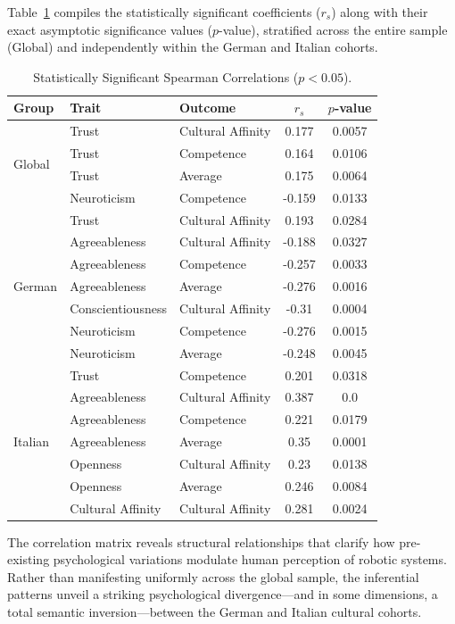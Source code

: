 Table~\ref{tab:meaningful_correlations} compiles the statistically significant coefficients ($r_s$) along with their exact asymptotic significance values ($p$-value), stratified across the entire sample (Global) and independently within the German and Italian cohorts.
\begin{table}[ht]
\centering
\begin{tabular}{lllcc}
\toprule
\textbf{Group} & \textbf{Trait} & \textbf{Outcome} & \textbf{$r_s$} & \textbf{$p$-value} \\
\midrule
\multirow{4}{*}{Global} 
 & Trust & Cultural Affinity & 0.177 & 0.0057 \\
 & Trust & Competence & 0.164 & 0.0106 \\
 & Trust & Average & 0.175 & 0.0064 \\
 & Neuroticism & Competence & -0.159 & 0.0133 \\
\midrule
\multirow{7}{*}{German} 
 & Trust & Cultural Affinity & 0.193 & 0.0284 \\
 & Agreeableness & Cultural Affinity & -0.188 & 0.0327 \\
 & Agreeableness & Competence & -0.257 & 0.0033 \\
 & Agreeableness & Average & -0.276 & 0.0016 \\
 & Conscientiousness & Cultural Affinity & -0.31 & 0.0004 \\
 & Neuroticism & Competence & -0.276 & 0.0015 \\
 & Neuroticism & Average & -0.248 & 0.0045 \\
\midrule
\multirow{7}{*}{Italian} 
 & Trust & Competence & 0.201 & 0.0318 \\
 & Agreeableness & Cultural Affinity & 0.387 & 0.0 \\
 & Agreeableness & Competence & 0.221 & 0.0179 \\
 & Agreeableness & Average & 0.35 & 0.0001 \\
 & Openness & Cultural Affinity & 0.23 & 0.0138 \\
 & Openness & Average & 0.246 & 0.0084 \\
 & Cultural Affinity & Cultural Affinity & 0.281 & 0.0024 \\
\bottomrule
\end{tabular}
\caption{Statistically Significant Spearman Correlations ($p < 0.05$).}
\label{tab:meaningful_correlations}
\end{table}
The correlation matrix reveals structural relationships that clarify how pre-existing psychological variations modulate human perception of robotic systems. 
Rather than manifesting uniformly across the global sample, the inferential patterns unveil a striking psychological divergence—and in some dimensions, a total semantic inversion—between the German and Italian cultural cohorts.

